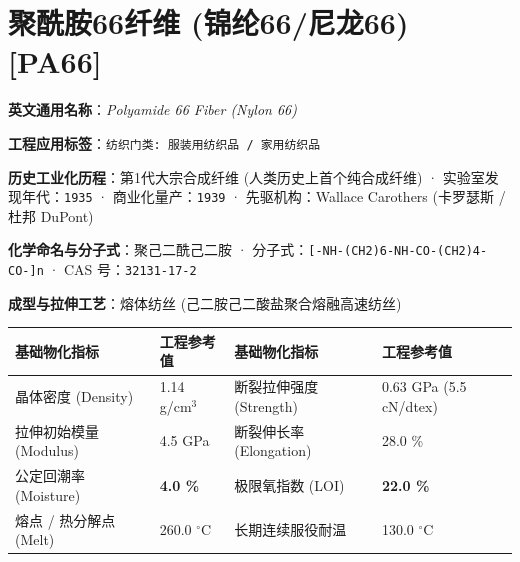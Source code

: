 \documentclass[11pt,openright,twoside,UTF8]{ctexbook}
\begin{document}
\section{聚酰胺66纤维 (锦纶66/尼龙66) [PA66]}
\label{sec:pa66}

\noindent\textbf{英文通用名称}：\textit{Polyamide 66 Fiber (Nylon 66)}\par
\noindent\textbf{工程应用标签}：\texttt{纺织门类: 服装用纺织品 / 家用纺织品}\par
\noindent\textbf{历史工业化历程}：第1代大宗合成纤维 (人类历史上首个纯合成纤维) · 实验室发现年代：\texttt{1935} · 商业化量产：\texttt{1939} · 先驱机构：Wallace Carothers (卡罗瑟斯 / 杜邦 DuPont)\par
\noindent\textbf{化学命名与分子式}：聚己二酰己二胺 · 分子式：\texttt{[-NH-(CH2)6-NH-CO-(CH2)4-CO-]n} · CAS 号：\texttt{32131-17-2}\par
\noindent\textbf{成型与拉伸工艺}：熔体纺丝 (己二胺己二酸盐聚合熔融高速纺丝)\par

\vspace{0.15cm}
\begin{center}
\small
\begin{tabularx}{\textwidth}{p{3.8cm}Xp{3.8cm}X}
\toprule
\textbf{基础物化指标} & \textbf{工程参考值} & \textbf{基础物化指标} & \textbf{工程参考值} \\
\midrule
晶体密度 (Density) & 1.14 g/cm$^3$ & 断裂拉伸强度 (Strength) & 0.63 GPa (5.5 cN/dtex) \\
拉伸初始模量 (Modulus) & 4.5 GPa & 断裂伸长率 (Elongation) & 28.0 \% \\
公定回潮率 (Moisture) & \textbf{4.0 \%} & 极限氧指数 (LOI) & \textbf{22.0 \%} \\
熔点 / 热分解点 (Melt) & 260.0 $^\circ\mathrm{C}$ & 长期连续服役耐温 & 130.0 $^\circ\mathrm{C}$ \\
\bottomrule
\end{tabularx}
\end{center}
\vspace{0.15cm}
\end{document}
